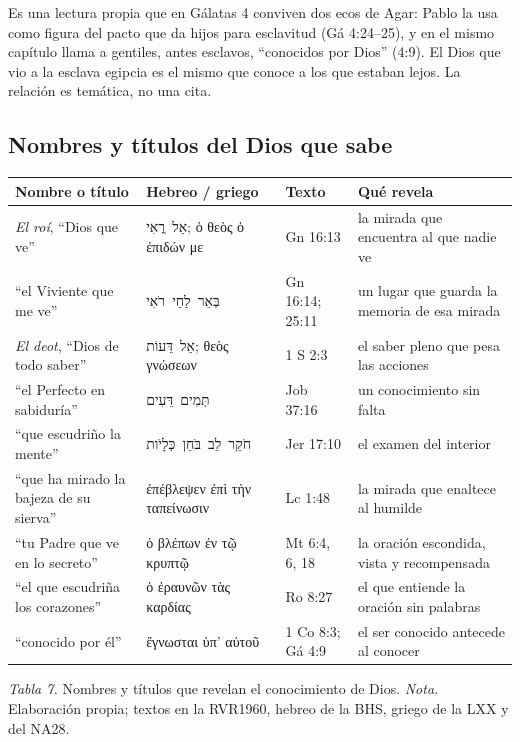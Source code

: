\documentclass[11pt,letterpaper]{article}
\newcommand{\heb}[1]{\mbox{\foreignlanguage{hebrew}{#1}}}
\newcommand{\grc}[1]{\foreignlanguage{ancientgreek}{#1}}
\begin{document}
\begin{nota}[Precisión]
Es una lectura propia que en Gálatas 4 conviven dos ecos de Agar: Pablo la usa como figura del pacto que da hijos para esclavitud (Gá 4:24--25), y en el mismo capítulo llama a gentiles, antes esclavos, ``conocidos por Dios'' (4:9). El Dios que vio a la esclava egipcia es el mismo que conoce a los que estaban lejos. La relación es temática, no una cita.
\end{nota}

\subsection{Nombres y títulos del Dios que sabe}

\begin{center}\small\renewcommand{\arraystretch}{1.2}
\begin{tabular}{@{}L{3.3cm}L{3.9cm}L{2.4cm}L{4.8cm}@{}}
\toprule
\textbf{Nombre o título} & \textbf{Hebreo / griego} & \textbf{Texto} & \textbf{Qué revela} \\ \midrule
\emph{El roí}, ``Dios que ve'' & \heb{אֵל רֳאִי}; \grc{ὁ θεὸς ὁ ἐπιδών με} & Gn 16:13 & la mirada que encuentra al que nadie ve \\
``el Viviente que me ve'' & \heb{בְּאֵר לַחַי רֹאִי} & Gn 16:14; 25:11 & un lugar que guarda la memoria de esa mirada \\
\emph{El deot}, ``Dios de todo saber'' & \heb{אֵל דֵּעוֹת}; \grc{θεὸς γνώσεων} & 1 S 2:3 & el saber pleno que pesa las acciones \\
``el Perfecto en sabiduría'' & \heb{תְּמִים דֵּעִים} & Job 37:16 & un conocimiento sin falta \\
``que escudriño la mente'' & \heb{חֹקֵר לֵב בֹּחֵן כְּלָיֹות} & Jer 17:10 & el examen del interior \\
``que ha mirado la bajeza de su sierva'' & \grc{ἐπέβλεψεν ἐπὶ τὴν ταπείνωσιν} & Lc 1:48 & la mirada que enaltece al humilde \\
``tu Padre que ve en lo secreto'' & \grc{ὁ βλέπων ἐν τῷ κρυπτῷ} & Mt 6:4, 6, 18 & la oración escondida, vista y recompensada \\
``el que escudriña los corazones'' & \grc{ὁ ἐραυνῶν τὰς καρδίας} & Ro 8:27 & el que entiende la oración sin palabras \\
``conocido por él'' & \grc{ἔγνωσται ὑπ’ αὐτοῦ} & 1 Co 8:3; Gá 4:9 & el ser conocido antecede al conocer \\
\bottomrule
\end{tabular}\par
{\footnotesize\color{gris}\textit{Tabla 7.} Nombres y títulos que revelan el conocimiento de Dios. \textit{Nota.} Elaboración propia; textos en la RVR1960, hebreo de la BHS, griego de la LXX y del NA28.}
\end{center}
\end{document}
